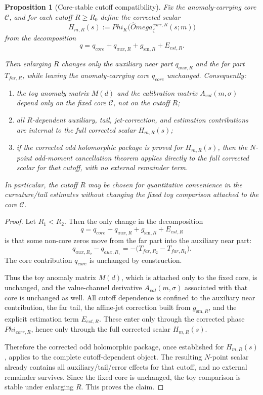 \documentclass[11pt,a4paper]{amsart}
\def\Omega{Omega}%
\def\Phi{Phi}%
\def\corr{corr}%
\def\val{val}%
\def\far{far}%
\def\est{est}%
\def\core{core}%
\def\aux{aux}%
\theoremstyle{plain}
\newtheorem{proposition}[theorem]{Proposition}
\theoremstyle{definition}
\newcommand{\sm}{\mathrm{sm}}
\newcommand{\far}{\mathrm{far}}
\newcommand{\est}{\mathrm{est}}
\newcommand{\val}{\mathrm{val}}
\newcommand{\corr}{\mathrm{corr}}
\newcommand{\core}{\mathrm{core}}
\newcommand{\aux}{\mathrm{aux}}
\begin{document}
\begin{proposition}[Core-stable cutoff compatibility]
\label{prop:cutoff-compatibility}
Fix the anomaly-carrying core $\mathcal C$, and for each cutoff $R\ge R_0$
define the corrected scalar
\[
H_{m,R}(s):=\Phi_K\!\bigl(\widehat\Omega_\zeta^{\corr,R}(s;m)\bigr)
\]
from the decomposition
\[
q=q_{\core}+q_{\aux,R}+g_{\sm,R}+E_{\est,R}.
\]

Then enlarging $R$ changes only the auxiliary near part $q_{\aux,R}$ and the
far part $T_{\far,R}$, while leaving the anomaly-carrying core
$q_{\core}$ unchanged. Consequently:
\begin{enumerate}
\item the toy anomaly matrix $M(d)$ and the calibration matrix
$A_{\val}(m,\sigma)$ depend only on the fixed core $\mathcal C$, not on
the cutoff $R$;
\item all $R$-dependent auxiliary, tail, jet-correction, and estimation
contributions are internal to the full corrected scalar $H_{m,R}(s)$;
\item if the corrected odd holomorphic package is proved for $H_{m,R}(s)$,
then the $N$-point odd-moment cancellation theorem applies directly to the
full corrected scalar for that cutoff, with no external remainder term.
\end{enumerate}

In particular, the cutoff $R$ may be chosen for quantitative convenience in
the curvature/tail estimates without changing the fixed toy comparison
attached to the core $\mathcal C$.
\end{proposition}

\begin{proof}
Let $R_1<R_2$. Then the only change in the decomposition
\[
q=q_{\core}+q_{\aux,R}+g_{\sm,R}+E_{\est,R}
\]
is that some non-core zeros move from the far part into the auxiliary near
part:
\[
q_{\aux,R_2}-q_{\aux,R_1}
=
-\bigl(T_{\far,R_2}-T_{\far,R_1}\bigr).
\]
The core contribution $q_{\core}$ is unchanged by construction.

Thus the toy anomaly matrix $M(d)$, which is attached only to the fixed core,
is unchanged, and the value-channel derivative $A_{\val}(m,\sigma)$ associated
with that core is unchanged as well. All cutoff dependence is confined to the
auxiliary near contribution, the far tail, the affine-jet correction built
from $g_{\sm,R}$, and the explicit estimation term $E_{\est,R}$. These enter
only through the corrected phase $\Phi_{\corr,R}$, hence only through the full
corrected scalar $H_{m,R}(s)$.

Therefore the corrected odd holomorphic package, once established for
$H_{m,R}(s)$, applies to the complete cutoff-dependent object. The resulting
$N$-point scalar already contains all auxiliary/tail/error effects for that
cutoff, and no external remainder survives. Since the fixed core is
unchanged, the toy comparison is stable under enlarging $R$. This proves the
claim.
\end{proof}
\end{document}

